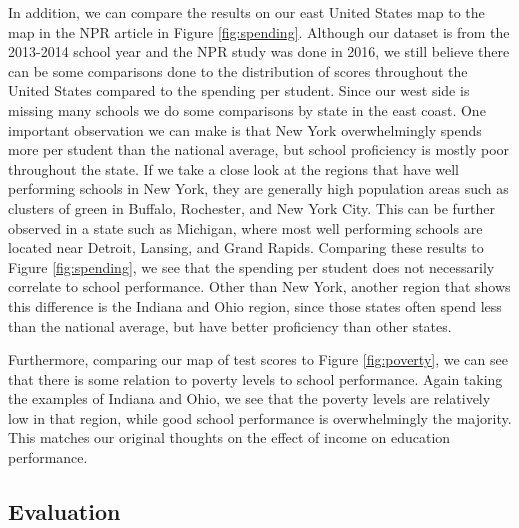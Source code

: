 In addition, we can compare the results on our east United States map to the map in the NPR article \cite{npr2016} in Figure \ref{fig:spending}. Although our dataset is from the 2013-2014 school year and the NPR study was done in 2016, we still believe there can be some comparisons done to the distribution of scores throughout the United States compared to the spending per student. Since our west side is missing many schools we do some comparisons by state in the east coast. One important observation we can make is that New York overwhelmingly spends more per student than the national average, but school proficiency is mostly poor throughout the state. If we take a close look at the regions that have well performing schools in New York, they are generally high population areas such as clusters of green in Buffalo, Rochester, and New York City. This can be further observed in a state such as Michigan, where most well performing schools are located near Detroit, Lansing, and Grand Rapids. Comparing these results to Figure \ref{fig:spending}, we see that the spending per student does not necessarily correlate to school performance. Other than New York, another region that shows this difference is the Indiana and Ohio region, since those states often spend less than the national average, but have better proficiency than other states.

Furthermore, comparing our map of test scores to Figure \ref{fig:poverty}, we can see that there is some relation to poverty levels to school performance. Again taking the examples of Indiana and Ohio, we see that the poverty levels are relatively low in that region, while good school performance is overwhelmingly the majority. This matches our original thoughts on the effect of income on education performance.

\subsection{Evaluation} \label{sec:evaluation}

